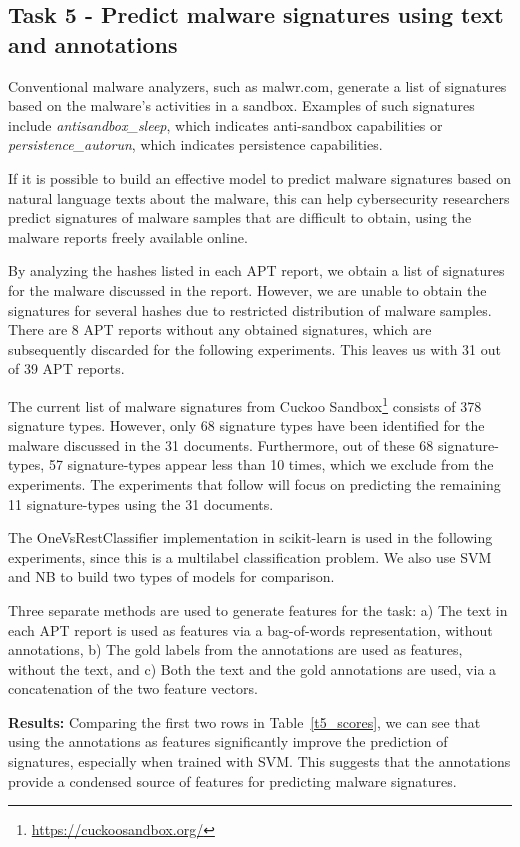 \documentclass[11pt,a4paper]{article}
\begin{document}
\subsection{Task 5 - Predict malware signatures using text and annotations}

Conventional malware analyzers, such as malwr.com, generate a list of signatures based on the malware's activities in a sandbox. Examples of such signatures include \emph{antisandbox\_sleep}, which indicates anti-sandbox capabilities or \emph{persistence\_autorun}, which indicates persistence capabilities. 

If it is possible to build an effective model to predict malware signatures based on natural language texts about the malware, this can help cybersecurity researchers predict signatures of malware samples that are difficult to obtain, using the malware reports freely available online. 

By analyzing the hashes listed in each APT report, we obtain a list of signatures for the malware discussed in the report. However, we are unable to obtain the signatures for several hashes due to restricted distribution of malware samples. There are 8 APT reports without any obtained signatures, which are subsequently discarded for the following experiments. This leaves us with 31 out of 39 APT reports.

The current list of malware signatures from Cuckoo Sandbox\footnote{\url{https://cuckoosandbox.org/}} consists of 378 signature types. However, only 68 signature types have been identified for the malware discussed in the 31 documents. Furthermore, out of these 68 signature-types, 57 signature-types appear less than 10 times, which we exclude from the experiments. The experiments that follow will focus on predicting the remaining 11 signature-types using the 31 documents.

The OneVsRestClassifier implementation in scikit-learn is used in the following experiments, since this is a multilabel classification problem. We also use SVM and NB to build two types of models for comparison.

Three separate methods are used to generate features for the task: a) The text in each APT report is used as features via a bag-of-words representation, without annotations, b) The gold labels from the annotations are used as features, without the text, and c) Both the text and the gold annotations are used, via a concatenation of the two feature vectors.

\textbf{Results:} Comparing the first two rows in Table~\ref{t5_scores}, we can see that using the annotations as features significantly improve the prediction of signatures, especially when trained with SVM. This suggests that the annotations provide a condensed source of features for predicting malware signatures.
\end{document}
